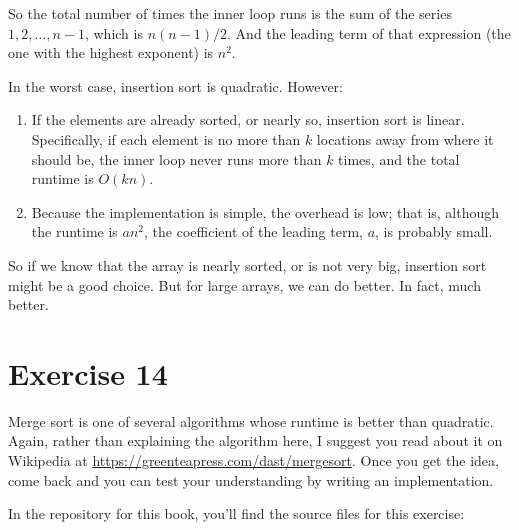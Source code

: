 \documentclass[12pt]{book}
\theoremstyle{exercise}
\newcommand{\java}{\verb}%}
\begin{document}
So the total number of times the inner loop runs is the sum of the
series $1, 2, \ldots , n-1$, which is $n (n-1) / 2$. And the
leading term of that expression (the one with the highest exponent) is
$n^2$.


In the worst case, insertion sort is quadratic. However:

\begin{enumerate}

\item
  If the elements are already sorted, or nearly so, insertion sort is
  linear. Specifically, if each element is no more than $k$
  locations away from where it should be, the inner loop never runs more
  than $k$ times, and the total runtime is $O(kn)$.

\item
  Because the implementation is simple, the overhead is low; that is,
  although the runtime is $a n^2$, the coefficient of the leading
  term, $a$, is probably small.

\end{enumerate}

So if we know that the array is nearly sorted, or is not very big,
insertion sort might be a good choice. But for large arrays, we can
do better. In fact, much better.


\section{Exercise 14}
\label{exercise14}

Merge sort is one of several algorithms whose runtime is better than
quadratic. Again, rather than explaining the algorithm here, I suggest
you read about it on Wikipedia at
\url{https://greenteapress.com/dast/mergesort}.  Once you get the idea, come
back and you can test your understanding by writing an implementation.


In the repository for this book, you'll find the source files for this
exercise:

\end{document}
